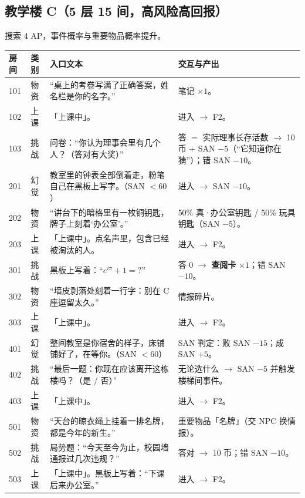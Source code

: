 \documentclass[UTF8, fontset=none, 11pt]{ctexart}
\begin{document}
\subsection{教学楼 C（5 层 15 间，高风险高回报）}
搜索 4 AP，事件概率与重要物品概率提升。
\begin{longtable}{p{1.1cm}p{1.2cm}p{6.6cm}p{5.5cm}}
\toprule
房间 & 类别 & 入口文本 & 交互与产出 \\
\midrule
\endhead
101 & 物资 & ``桌上的考卷写满了正确答案，姓名栏是你的名字。'' & 笔记 $\times 1$。 \\
102 & 上课 & 「上课中」。 & 进入 $\to$ F2。 \\
103 & 挑战 & 问卷：``你认为理事会里有几个人？（答对有大奖）'' & 答 $=$ 实际理事长存活数 $\to$ 10 币 + SAN $-5$（``它知道你在猜''）；错 SAN $-10$。 \\
201 & 幻觉 & 教室里的钟表全部倒着走，粉笔自己在黑板上写字。（SAN $<60$） & 进入 $\to$ SAN $-10$。 \\
202 & 物资 & ``讲台下的暗格里有一枚铜钥匙，牌子上刻着`办公室'。'' & 50\% 真·办公室钥匙 / 50\% 玩具钥匙（SAN $-5$）。 \\
203 & 上课 & 「上课中」。点名声里，包含已经被淘汰的人。 & 进入 $\to$ F2。 \\
301 & 挑战 & 黑板上写着：``$e^{i\pi}+1=?$'' & 答 $0$ $\to$ \textbf{查阅卡} $\times 1$；错 SAN $-10$。 \\
302 & 物资 & ``墙皮剥落处刻着一行字：别在 C 座逗留太久。'' & 情报碎片。 \\
303 & 上课 & 「上课中」。 & 进入 $\to$ F2。 \\
401 & 幻觉 & 整间教室是你宿舍的样子，床铺铺好了，在等你。（SAN $<60$） & SAN 判定：败 SAN $-15$；成 SAN $+5$。 \\
402 & 挑战 & ``最后一题：你现在应该离开这栋楼吗？（是 / 否）'' & 无论选什么 $\to$ SAN $-5$ 并触发楼梯间事件。 \\
403 & 上课 & 「上课中」。 & 进入 $\to$ F2。 \\
501 & 物资 & ``天台的晾衣绳上挂着一排名牌，都是今年的新生。'' & 重要物品「名牌」（交 NPC 换情报）。 \\
502 & 挑战 & 局势题：``今天至今为止，校园墙通报过几次违规？'' & 答对 $\to$ 10 币；错 SAN $-10$。 \\
503 & 上课 & 「上课中」。黑板上写着：``下课后来办公室。'' & 进入 $\to$ F2。 \\
\bottomrule
\end{longtable}
\end{document}
